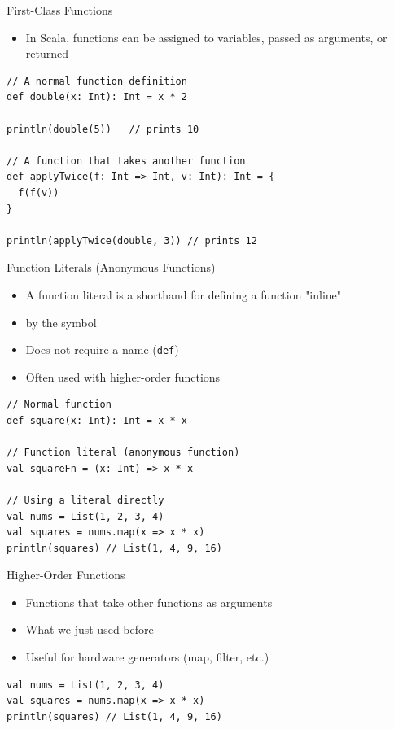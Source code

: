 \begin{frame}[fragile]{First-Class Functions}
\begin{itemize}
    \item In Scala, functions can be assigned to variables, passed as arguments, or returned
\end{itemize}

\begin{verbatim}
// A normal function definition
def double(x: Int): Int = x * 2

println(double(5))   // prints 10

// A function that takes another function
def applyTwice(f: Int => Int, v: Int): Int = {
  f(f(v))
}

println(applyTwice(double, 3)) // prints 12
\end{verbatim}
\end{frame}

\begin{frame}[fragile]{Function Literals (Anonymous Functions)}
\begin{itemize}
    \item A function literal is a shorthand for defining a function "inline"
    \item by the \code{=>} symbol
    \item Does not require a name (\texttt{def})
    \item Often used with higher-order functions
\end{itemize}

\begin{verbatim}
// Normal function
def square(x: Int): Int = x * x

// Function literal (anonymous function)
val squareFn = (x: Int) => x * x

// Using a literal directly
val nums = List(1, 2, 3, 4)
val squares = nums.map(x => x * x)
println(squares) // List(1, 4, 9, 16)
\end{verbatim}
\end{frame}

\begin{frame}[fragile]{Higher-Order Functions}
\begin{itemize}
    \item Functions that take other functions as arguments
    \item What we just used before
    \item Useful for hardware generators (map, filter, etc.)
\end{itemize}

\begin{verbatim}
val nums = List(1, 2, 3, 4)
val squares = nums.map(x => x * x)
println(squares) // List(1, 4, 9, 16)
\end{verbatim}

%
\end{frame}

